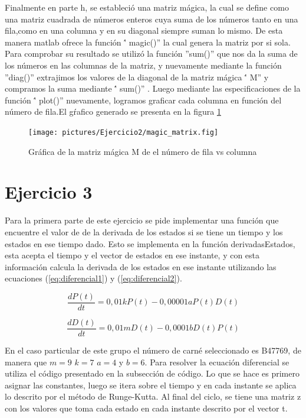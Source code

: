 \documentclass[12pt,letterpaper]{article}
\begin{document}
Finalmente en parte h, se estableció una matriz mágica, la cual se define como una matriz cuadrada de números enteros cuya suma de los números tanto en una fila,como en una columna y en su diagonal siempre suman lo mismo. De esta manera matlab ofrece la función \'' magic()'' la cual genera la matriz por si sola. Para comprobar su resultado se utilizó la función ''sum()'' que nos da la suma de los números en las columnas de la matriz, y nuevamente mediante la función ''diag()'' extrajimos los valores de la diagonal de la matriz mágica \'' M'' y compramos la suma mediante \'' sum()'' . Luego mediante las especificaciones de la función \'' plot()'' nuevamente, logramos graficar cada columna en función del número de fila.El gŕafico generado se presenta en la figura \ref{fig:magical}

\begin{figure}[ht!]
	\centering
	\texttt{[image: pictures/Ejercicio2/magic\_matrix.fig]}
	\caption{Gráfica de la matriz mágica M de el número de fila vs columna}
	\label{fig:magical}
\end{figure} 



\section{Ejercicio 3}

Para la primera parte de este ejercicio se pide implementar una función  que encuentre el valor de de la derivada de los estados si se tiene un tiempo y los estados en ese tiempo dado. Esto se implementa en la función derivadasEstados, esta acepta el tiempo y el vector de estados en ese instante, y con esta información calcula la derivada de los estados en ese instante utilizando las ecuaciones (\ref{eq:diferencial1}) y (\ref{eq:diferencial2}). 

\begin{equation}
\frac{dP(t)}{dt}=0,01kP(t)-0,00001aP(t)D(t)
\label{eq:diferencial1}
\end{equation}

\begin{equation}
\frac{dD(t)}{dt}=0,01mD(t)-0,0001bD(t)P(t)
\label{eq:diferencial2}
\end{equation}

En el caso particular de este grupo el número de carné seleccionado es B47769, de manera que $m=9$ $k=7$ $a=4$ y $b=6$. Para resolver la ecuación diferencial se utiliza el código presentado en la subsección de código. Lo que se hace es primero asignar las constantes, luego se itera sobre el tiempo y en cada instante se aplica lo descrito por el método de Runge-Kutta. Al final del ciclo, se tiene una matriz z con los valores que toma cada estado en cada instante descrito por el vector t. 
\end{document}
